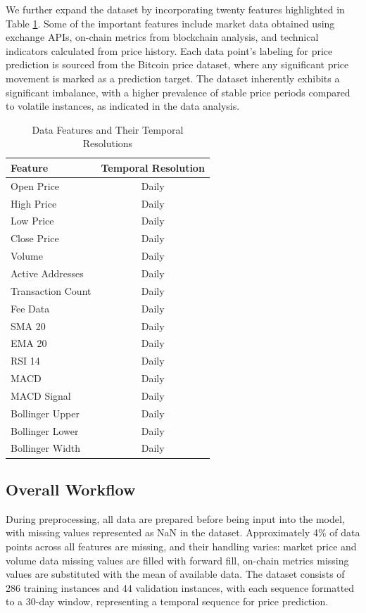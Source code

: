 \documentclass[conference]{IEEEtran}
\begin{document}
We further expand the dataset by incorporating twenty features highlighted in Table \ref{tab:features}. Some of the important features include market data obtained using exchange APIs, on-chain metrics from blockchain analysis, and technical indicators calculated from price history. Each data point's labeling for price prediction is sourced from the Bitcoin price dataset, where any significant price movement is marked as a prediction target. The dataset inherently exhibits a significant imbalance, with a higher prevalence of stable price periods compared to volatile instances, as indicated in the data analysis.

\begin{table}[htbp]
\caption{Data Features and Their Temporal Resolutions}
\begin{center}
\begin{tabular}{|l|c|}
\hline
\textbf{Feature} & \textbf{Temporal Resolution} \\
\hline
Open Price & Daily \\
High Price & Daily \\
Low Price & Daily \\
Close Price & Daily \\
Volume & Daily \\
Active Addresses & Daily \\
Transaction Count & Daily \\
Fee Data & Daily \\
SMA 20 & Daily \\
EMA 20 & Daily \\
RSI 14 & Daily \\
MACD & Daily \\
MACD Signal & Daily \\
Bollinger Upper & Daily \\
Bollinger Lower & Daily \\
Bollinger Width & Daily \\
\hline
\end{tabular}
\label{tab:features}
\end{center}
\end{table}

\subsection{Overall Workflow}

During preprocessing, all data are prepared before being input into the model, with missing values represented as NaN in the dataset. Approximately 4\% of data points across all features are missing, and their handling varies: market price and volume data missing values are filled with forward fill, on-chain metrics missing values are substituted with the mean of available data. The dataset consists of 286 training instances and 44 validation instances, with each sequence formatted to a 30-day window, representing a temporal sequence for price prediction.
\end{document}
